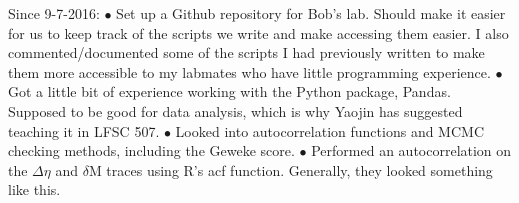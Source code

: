 \documentclass[11pt]{labbook}
\begin{document}
Since 9-7-2016:
$\bullet$ Set up a Github repository for Bob's lab. Should make it easier for us to keep track of the scripts we write and make accessing them easier. I also commented/documented some of the scripts I had previously written to make them more accessible to my labmates who have little programming experience. \newline
$\bullet$ Got a little bit of experience working with the Python package, Pandas. Supposed to be good for data analysis, which is why Yaojin has suggested teaching it in LFSC 507. \newline
$\bullet$ Looked into autocorrelation functions and MCMC checking methods, including the Geweke score. \newline
$\bullet$ Performed an autocorrelation on the $\Delta\eta$ and $\delta$M traces using R's acf function. Generally, they looked something like this.

\end{document}
